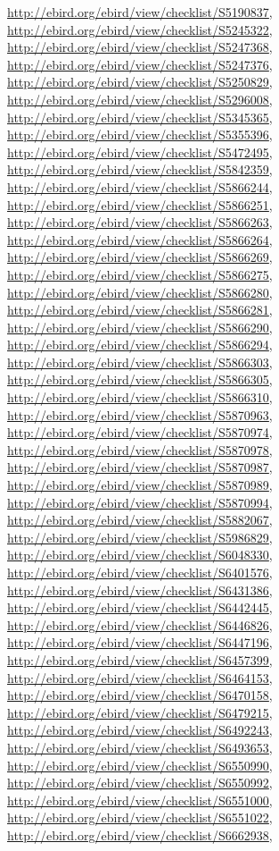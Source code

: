 \documentclass[9pt, article]{memoir}
\begin{document}
\begin{multicols}{2}
\url{http://ebird.org/ebird/view/checklist/S5190837}, 
\url{http://ebird.org/ebird/view/checklist/S5245322}, 
\url{http://ebird.org/ebird/view/checklist/S5247368}, 
\url{http://ebird.org/ebird/view/checklist/S5247376}, 
\url{http://ebird.org/ebird/view/checklist/S5250829}, 
\url{http://ebird.org/ebird/view/checklist/S5296008}, 
\url{http://ebird.org/ebird/view/checklist/S5345365}, 
\url{http://ebird.org/ebird/view/checklist/S5355396}, 
\url{http://ebird.org/ebird/view/checklist/S5472495}, 
\url{http://ebird.org/ebird/view/checklist/S5842359}, 
\url{http://ebird.org/ebird/view/checklist/S5866244}, 
\url{http://ebird.org/ebird/view/checklist/S5866251}, 
\url{http://ebird.org/ebird/view/checklist/S5866263}, 
\url{http://ebird.org/ebird/view/checklist/S5866264}, 
\url{http://ebird.org/ebird/view/checklist/S5866269}, 
\url{http://ebird.org/ebird/view/checklist/S5866275}, 
\url{http://ebird.org/ebird/view/checklist/S5866280}, 
\url{http://ebird.org/ebird/view/checklist/S5866281}, 
\url{http://ebird.org/ebird/view/checklist/S5866290}, 
\url{http://ebird.org/ebird/view/checklist/S5866294}, 
\url{http://ebird.org/ebird/view/checklist/S5866303}, 
\url{http://ebird.org/ebird/view/checklist/S5866305}, 
\url{http://ebird.org/ebird/view/checklist/S5866310}, 
\url{http://ebird.org/ebird/view/checklist/S5870963}, 
\url{http://ebird.org/ebird/view/checklist/S5870974}, 
\url{http://ebird.org/ebird/view/checklist/S5870978}, 
\url{http://ebird.org/ebird/view/checklist/S5870987}, 
\url{http://ebird.org/ebird/view/checklist/S5870989}, 
\url{http://ebird.org/ebird/view/checklist/S5870994}, 
\url{http://ebird.org/ebird/view/checklist/S5882067}, 
\url{http://ebird.org/ebird/view/checklist/S5986829}, 
\url{http://ebird.org/ebird/view/checklist/S6048330}, 
\url{http://ebird.org/ebird/view/checklist/S6401576}, 
\url{http://ebird.org/ebird/view/checklist/S6431386}, 
\url{http://ebird.org/ebird/view/checklist/S6442445}, 
\url{http://ebird.org/ebird/view/checklist/S6446826}, 
\url{http://ebird.org/ebird/view/checklist/S6447196}, 
\url{http://ebird.org/ebird/view/checklist/S6457399}, 
\url{http://ebird.org/ebird/view/checklist/S6464153}, 
\url{http://ebird.org/ebird/view/checklist/S6470158}, 
\url{http://ebird.org/ebird/view/checklist/S6479215}, 
\url{http://ebird.org/ebird/view/checklist/S6492243}, 
\url{http://ebird.org/ebird/view/checklist/S6493653}, 
\url{http://ebird.org/ebird/view/checklist/S6550990}, 
\url{http://ebird.org/ebird/view/checklist/S6550992}, 
\url{http://ebird.org/ebird/view/checklist/S6551000}, 
\url{http://ebird.org/ebird/view/checklist/S6551022}, 
\url{http://ebird.org/ebird/view/checklist/S6662938}, 

\end{multicols}
\end{document}
